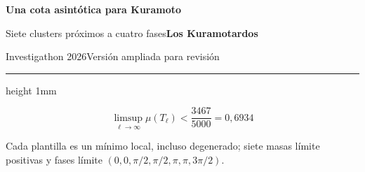 \documentclass[12pt]{article}
\begin{document}
\color{ink}
{\fontsize{58}{65}\selectfont\bfseries Una cota asintótica para Kuramoto\par}
{\fontsize{30}{37}\selectfont Siete clusters próximos a cuatro fases\hfill\textbf{Los Kuramotardos}\par}
{\fontsize{22}{28}\selectfont Investigathon 2026\hfill Versión ampliada para revisión\par}
\vspace{2mm}
{\color{teal}\hrule height 1mm}
\vspace{3mm}
{\fontsize{50}{58}\selectfont\color{teal}
\[\boxed{\displaystyle\limsup_{\ell\to\infty}\mu(T_\ell)<\frac{3467}{5000}=0{,}6934}\]}
{\fontsize{24}{31}\selectfont\centering
Cada plantilla es un mínimo local, incluso degenerado; siete masas límite positivas y fases límite $(0,0,\pi/2,\pi/2,\pi,\pi,3\pi/2)$.\par}
\vspace{7mm}
\fontsize{24}{31}\selectfont
\end{document}

